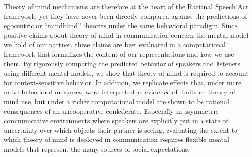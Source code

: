 \documentclass[manuscript]{stjour}
\begin{document}

Theory of mind mechanisms are therefore at the heart of the Rational Speech Act framework, yet they have never been directly compared against the predictions of egocentric or ``mindblind'' theories under the same behavioral paradigm. 
Since positive claims about theory of mind in communication concern the mental model we hold of our partner, these claims are best evaluated in a computational framework that formalizes the content of our representations and how we use them. 
By rigorously comparing the predicted behavior of speakers and listeners using different mental models, we show that theory of mind is required to account for context-sensitive behavior. 
In addition, we replicate effects that, under more naive behavioral measures, were interpreted as evidence of limits on theory of mind use, but under a richer computational model are shown to be rational consequences of an uncooperative confederate. Especially in asymmetric communicative environments where speakers are explicitly put in a state of uncertainty over which objects their partner is seeing, evaluating the extent to which theory of mind is deployed in communication requires flexible mental models that represent the many sources of social expectations.


\end{document}
